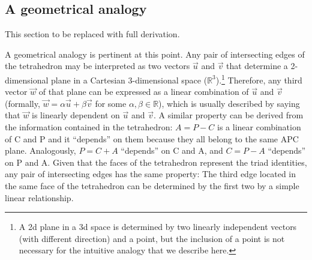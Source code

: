 \documentclass[12pt,oneside,a4paper]{article} %
\newcommand\vt[1]{\textcolor{rd}{#1}}
\begin{document}



\subsection{A geometrical analogy}
\vt{This section to be replaced with full derivation.}

A geometrical analogy is pertinent at this point. Any pair of intersecting edges
of the tetrahedron may be interpreted as two vectors $\vec{u}$ and $\vec{v}$
that determine a 2-dimensional plane in a Cartesian 3-dimensional
space ($\mathbb{R}^3$).\footnote{A 2d plane in a 3d space is determined by two linearly independent
vectors (with different direction) and a point, but the inclusion of a point is not
necessary for the intuitive analogy that we describe here.} Therefore, any third
vector $\vec{w}$ of that plane can be expressed as a linear combination of
$\vec{u}$ and $\vec{v}$ (formally, $\vec{w}=\alpha\vec{u}+\beta\vec{v}$ for some $\alpha, \beta \in \mathbb{R}$), which is usually
described by saying that $\vec{w}$ is linearly dependent on $\vec{u}$ and
$\vec{v}$.
A similar property can be derived from the information contained in the
tetrahedron: $A=P-C$ is a linear combination of C and P and it ``depends''
on them because they all belong to the same APC plane. Analogously, $P=C+A$
``depends'' on C and A, and $C=P-A$ ``depends'' on P and A. Given that the faces of the tetrahedron represent the triad identities, any pair of intersecting edges has the same property: The third edge located in the same face of the tetrahedron can be determined by the first two by a simple linear relationship.
\end{document}
